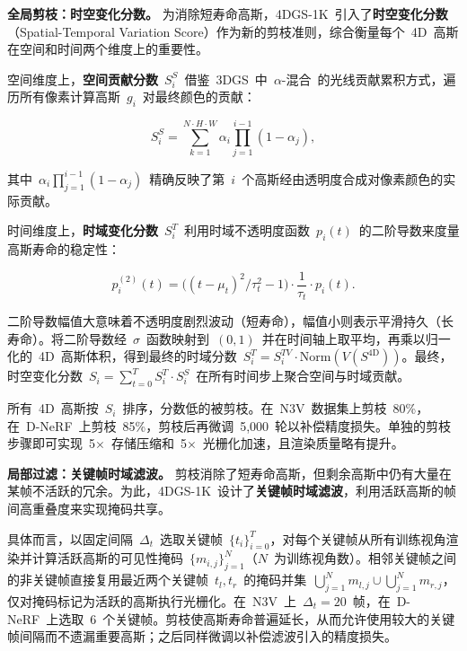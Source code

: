 \smallskip\noindent\textbf{全局剪枝：时空变化分数。}
为消除短寿命高斯，4DGS-1K~引入了\textbf{时空变化分数}（Spatial-Temporal Variation Score）作为新的剪枝准则，综合衡量每个~4D~高斯在空间和时间两个维度上的重要性。

空间维度上，\textbf{空间贡献分数}~$S_i^S$~借鉴~3DGS~中~$\alpha$-混合~的光线贡献累积方式，遍历所有像素计算高斯~$g_i$~对最终颜色的贡献：

\begin{equation}
S_i^S = \sum_{k=1}^{N \cdot H \cdot W} \alpha_i \prod_{j=1}^{i-1}(1-\alpha_j),
\end{equation}

其中~$\alpha_i \prod_{j=1}^{i-1}(1-\alpha_j)$~精确反映了第~$i$~个高斯经由透明度合成对像素颜色的实际贡献。

时间维度上，\textbf{时域变化分数}~$S_i^T$~利用时域不透明度函数~$p_i(t)$~的二阶导数来度量高斯寿命的稳定性：

\begin{equation}
p_i^{(2)}(t) = \bigl((t-\mu_t)^2 / \tau_t^2 - 1\bigr) \cdot \frac{1}{\tau_t} \cdot p_i(t).
\end{equation}

二阶导数幅值大意味着不透明度剧烈波动（短寿命），幅值小则表示平滑持久（长寿命）。将二阶导数经~$\sigma$~函数映射到~$(0,1)$~并在时间轴上取平均，再乘以归一化的~4D~高斯体积，得到最终的时域分数~$S_i^T = S_i^{TV} \cdot \mathrm{Norm}(V(S^{\mathrm{4D}}))$。最终，时空变化分数~$S_i = \sum_{t=0}^{T} S_i^T \cdot S_i^S$~在所有时间步上聚合空间与时域贡献。

所有~4D~高斯按~$S_i$~排序，分数低的被剪枝。在~N3V~数据集上剪枝~80\%，在~D-NeRF~上剪枝~85\%，剪枝后再微调~5{,}000~轮以补偿精度损失。单独的剪枝步骤即可实现~5$\times$~存储压缩和~5$\times$~光栅化加速，且渲染质量略有提升。

\smallskip\noindent\textbf{局部过滤：关键帧时域滤波。}
剪枝消除了短寿命高斯，但剩余高斯中仍有大量在某帧不活跃的冗余。为此，4DGS-1K~设计了\textbf{关键帧时域滤波}，利用活跃高斯的帧间高重叠度来实现掩码共享。

具体而言，以固定间隔~$\Delta_t$~选取关键帧~$\{t_i\}_{i=0}^{T}$，对每个关键帧从所有训练视角渲染并计算活跃高斯的可见性掩码~$\{m_{i,j}\}_{j=1}^{N}$（$N$~为训练视角数）。相邻关键帧之间的非关键帧直接复用最近两个关键帧~$t_l, t_r$~的掩码并集~$\bigcup_{j=1}^{N} m_{l,j} \cup \bigcup_{j=1}^{N} m_{r,j}$，仅对掩码标记为活跃的高斯执行光栅化。在~N3V~上~$\Delta_t = 20$~帧，在~D-NeRF~上选取~6~个关键帧。剪枝使高斯寿命普遍延长，从而允许使用较大的关键帧间隔而不遗漏重要高斯；之后同样微调以补偿滤波引入的精度损失。

